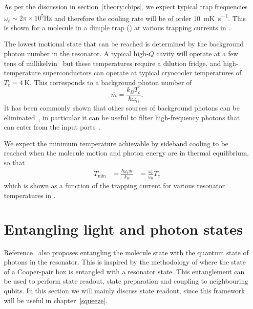 As per the discussion in section~\ref{theory:chips}, we expect typical trap
frequencies $\omega_t\sim 2\pi \times 10^5 \si{\hertz}$ and therefore the
cooling rate will be of order \SI{10}{\milli\kelvin\per\second}. This is shown
for a molecule in a dimple trap () at various trapping currents in
.

The lowest motional state that can be reached is determined by the background
photon number in the resonator. A typical high-$Q$ cavity will operate at a few
tens of millikelvin~\cite{doi:10.1063/1.3010859} but these temperatures require
a dilution fridge, and high-temperature superconductors can operate at typical
cryocooler temperatures of $T_\text{c}=\SI{4}{\kelvin}$. This corresponds
to a background photon number of
%
\begin{equation}
  \overline{m} = \frac{k_B T_c}{\hbar \omega_0}.
\end{equation}
%
It has been commonly shown that other sources of background photons can be
eliminated~\cite{Wallraff2004}, in particular it can be useful to filter
high-frequency photons that can enter from the input
ports~\cite{doi:10.1063/1.3638063}. 

We expect the minimum temperature achievable by sideband cooling to be reached
when the molecule motion and photon energy are in thermal equilibrium, so that
%
\begin{align}
  T_\text{min} &= \frac{\hbar \omega_t \overline{m}}{k_B}
               &= \frac{\omega_t}{\omega_0}T_c
\end{align}
%
which is shown as a function of the trapping current for various resonator
temperatures in .

\section{Entangling light and photon states}

Reference~\cite{Andre2006} also proposes entangling the molecule state with the
quantum state of photons in the resonator. This is inspired by the methodology
of  where the state of a Cooper-pair box is
entangled with a resonator state. This entanglement can be used to perform
state readout, state preparation and coupling to neighbouring qubits. In this
section we will mainly discuss state readout, since this framework will be
useful in chapter~\ref{squeeze}.

